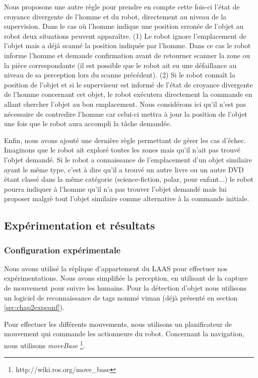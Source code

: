 \documentclass[a4paper,11pt,twoside]{StyleThese}
\begin{document}
Nous proposons une autre règle pour prendre en compte cette fois-ci l'état de croyance divergente de l'homme et du robot, directement au niveau de la supervision.
Dans le cas où l'homme indique une position erronée de l'objet au robot deux situations peuvent apparaître. (1) Le robot ignore l'emplacement de l'objet mais a déjà scanné la position indiquée par l'homme. Dans ce cas le robot informe l'homme et demande confirmation avant de retourner scanner la zone ou la pièce correspondante (il est possible que le robot ait eu une défaillance au niveau de sa perception lors du scanne précédent). (2) Si le robot connaît la position de l'objet et si le superviseur est informé de l'état de croyance divergente de l'homme concernant cet objet, le robot exécutera directement la commande en allant chercher l'objet au bon emplacement. Nous considérons ici qu'il n'est pas nécessaire de contredire l'homme car celui-ci mettra à jour la position de l'objet une fois que le robot aura accompli la tâche demandée.


Enfin, nous avons ajouté une dernière règle permettant de gérer les cas d'échec.
Imaginons que le robot ait exploré toutes les zones mais qu'il n'ait pas trouvé l'objet demandé. Si le robot a connaissance de l'emplacement d'un objet similaire ayant le même type, c'est à dire qu'il a trouvé un autre livre ou un autre DVD étant classé dans la même catégorie (science-fiction, polar, pour enfant...) le robot pourra indiquer à l'homme qu'il n'a pas trouver l'objet demandé mais lui proposer malgrè tout l'objet similaire comme alternative à la commande initiale.




\subsection{Expérimentation et résultats}

\subsubsection{Configuration expérimentale}
Nous avons utilisé la réplique d'appartement du LAAS pour effectuer nos expérimentations. Nous avons simplifiée la perception, en utilisant de la capture de mouvement pour suivre les humains. Pour la détection d'objet nous utilisons un logiciel de reconnaissance de tags nommé viman (déjà présenté en section \ref{sec:chap2expconf}).


Pour effectuer les différents mouvements, nous utilisons un planificateur de mouvement\cite{Sisbot2008} qui commande les actionneurs du robot.
Concernant la navigation, nous utilisons \textit{moveBase} \footnote{http://wiki.ros.org/move\_base}.
\end{document}
